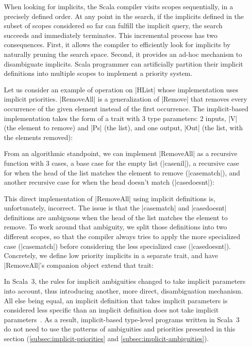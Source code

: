 When looking for implicits, the Scala compiler visits scopes sequentially, in a precisely defined order.
At any point in the search, if the implicits defined in the subset of scopes considered so far can fulfill the implicit query, the search succeeds and immediately terminates.
This incremental process has two consequences.
First, it allows the compiler to efficiently look for implicits by naturally pruning the search space.
Second, it provides an ad-hoc mechanism to disambiguate implicits.
Scala programmer can artificially partition their implicit definitions into multiple scopes to implement a priority system.

Let us consider an example of operation on |HList| whose implementation uses implicit priorities.
|RemoveAll| is a generalization of |Remove| that removes every occurrence of the given element instead of the first occurrence.
The implicit-based implementation takes the form of a trait with 3 type parameters: 2 inputs, |V| (the element to remove) and |Ps| (the list), and one output, |Out| (the list, with the elements removed):

\removeAllDefinition

From an algorithmic standpoint, we can implement |RemoveAll| as a recursive function with 3 cases, a base case for the empty list (|casenil|), a recursive case for when the head of the list matches the element to remove (|casematch|), and another recursive case for when the head doesn't match (|casedoesnt|):

\removeAllBroken

This direct implementation of |RemoveAll| using implicit definitions is, unfortunately, incorrect.
The issue is that the |casematch| and |casedoesnt| definitions are ambiguous when the head of the list matches the element to remove.
To work around that ambiguity, we split those definitions into two different scopes, so that the compiler always tries to apply the more specialized case (|casematch|) before considering the less specialized case (|casedoesnt|).
Concretely, we define low priority implicits in a separate trait, and have |RemoveAll|'s companion object extend that trait:

\removeAllPrioritized

In Scala~3, the rules for implicit ambiguities changed to take implicit parameters into account, thus introducing another, more direct, disambiguation mechanism.
All else being equal, an implicit definition that takes implicit parameters is considered less specific than an implicit definition does not take implicit parameters~\citep[Changes in Implicit Resolution]{odersky2013scala}.
As a result, implicit-based type-level programs written in Scala~3 do not need to use the patterns of ambiguities and priorities presented in this section (\ref{subsec:implicit-priorities} and \ref{subsec:implicit-ambiguities}).

